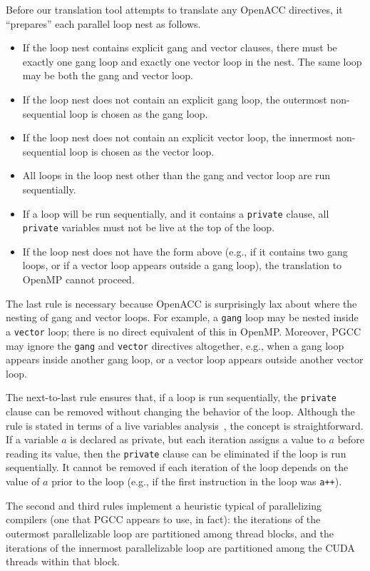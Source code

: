 \documentclass{sig-alternate-05-2015}
\newcommand{\squish}{
     { \setlength{\itemsep}{0pt}      \setlength{\parsep}{3pt}
       \setlength{\topsep}{3pt}       \setlength{\partopsep}{0pt}
       \setlength{\leftmargin}{1.5em} \setlength{\labelwidth}{1em}
       \setlength{\labelsep}{0.5em} } }
\begin{document}
Before our translation tool attempts to translate any OpenACC directives,
it ``prepares'' each parallel loop nest as follows.
\begin{itemize}\squish
\item If the loop nest contains explicit gang and vector clauses, there must be
exactly one gang loop and exactly one vector loop in the nest.  The same loop
may be both the gang and vector loop.
\item If the loop nest does not contain an explicit gang loop, the outermost
non-sequential loop is chosen as the gang loop.
\item If the loop nest does not contain an explicit vector loop, the innermost
non-sequential loop is chosen as the vector loop.
\item All loops in the loop nest other than the gang and vector loop are run
sequentially.
\item If a loop will be run sequentially, and it contains a \texttt{private}
clause, all \texttt{private} variables must not be live at the top of the loop.
\item If the loop nest does not have the form above (e.g., if it contains two
gang loops, or if a vector loop appears outside a gang loop), the translation
to OpenMP cannot proceed.
\end{itemize}

The last rule is necessary because OpenACC is surprisingly lax about where the
nesting of gang and vector loops.  For example, a \texttt{gang} loop may be
nested inside a \texttt{vector} loop; there is no direct equivalent of this in
OpenMP.  Moreover, PGCC may ignore the \texttt{gang} and \texttt{vector}
directives altogether, e.g., when a gang loop appears inside another gang loop,
or a vector loop appears outside another vector loop.

The next-to-last rule ensures that, if a loop is run sequentially, the
\texttt{private} clause can be removed without changing the behavior of the
loop.  Although the rule is stated in terms of a live variables
analysis~\cite{kennedy}, the concept is straightforward.  If a variable $a$
is declared as private, but each iteration assigns a value to $a$ before
reading its value, then the \texttt{private} clause can be eliminated if
the loop is run sequentially.  It cannot be removed if each iteration of the
loop depends on the value of $a$ prior to the loop (e.g., if the first
instruction in the loop was \texttt{a++}).

The second and third rules implement a heuristic typical of parallelizing
compilers (one that PGCC appears to use, in fact): the iterations of the
outermost parallelizable loop are partitioned among thread blocks, and the
iterations of the innermost parallelizable loop are partitioned among the CUDA
threads within that block.
\end{document}
